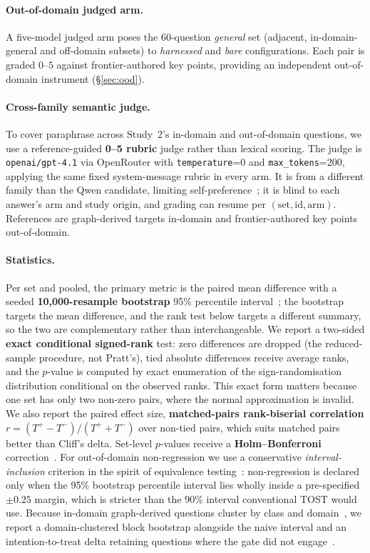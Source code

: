 \documentclass[10pt,twocolumn]{article}
\begin{document}
\paragraph{Out-of-domain judged arm.} A five-model judged arm poses the 60-question \emph{general} set (adjacent, in-domain-general and off-domain subsets) to \emph{harnessed} and \emph{bare} configurations. Each pair is graded $0$--$5$ against frontier-authored key points, providing an independent out-of-domain instrument (\S\ref{sec:ood}).

\paragraph{Cross-family semantic judge.} To cover paraphrase across Study~2's in-domain and out-of-domain questions, we use a reference-guided \textbf{0--5 rubric} judge rather than lexical scoring. The judge is \texttt{openai/gpt-4.1} via OpenRouter with \texttt{temperature}=0 and \texttt{max\_tokens}=200, applying the same fixed system-message rubric in every arm. It is from a different family than the Qwen candidate, limiting self-preference~\cite{zheng2023judging,panickssery2024selfpreference}; it is blind to each answer's arm and study origin, and grading can resume per $(\text{set},\text{id},\text{arm})$. References are graph-derived targets in-domain and frontier-authored key points out-of-domain.

\paragraph{Statistics.} Per set and pooled, the primary metric is the paired mean difference with a seeded \textbf{10{,}000-resample bootstrap} 95\% percentile interval~\cite{efron1979bootstrap,koehn2004significance}; the bootstrap targets the mean difference, and the rank test below targets a different summary, so the two are complementary rather than interchangeable. We report a two-sided \textbf{exact conditional signed-rank} test: zero differences are dropped (the reduced-sample procedure, not Pratt's), tied absolute differences receive average ranks, and the $p$-value is computed by exact enumeration of the sign-randomisation distribution conditional on the observed ranks. This exact form matters because one set has only two non-zero pairs, where the normal approximation is invalid. We also report the paired effect size, \textbf{matched-pairs rank-biserial correlation} $r=(T^{+}-T^{-})/(T^{+}+T^{-})$ over non-tied pairs, which suits matched pairs better than Cliff's delta. Set-level $p$-values receive a \textbf{Holm--Bonferroni} correction~\cite{dror2018hitchhiker}. For out-of-domain non-regression we use a conservative \emph{interval-inclusion} criterion in the spirit of equivalence testing~\cite{lakens2017equivalence}: non-regression is declared only when the 95\% bootstrap percentile interval lies wholly inside a pre-specified $\pm0.25$ margin, which is stricter than the 90\% interval conventional TOST would use. Because in-domain graph-derived questions cluster by class and domain~\cite{dror2018hitchhiker}, we report a domain-clustered block bootstrap alongside the naive interval and an intention-to-treat delta retaining questions where the gate did not engage~\cite{hollis1999itt}.
\end{document}
